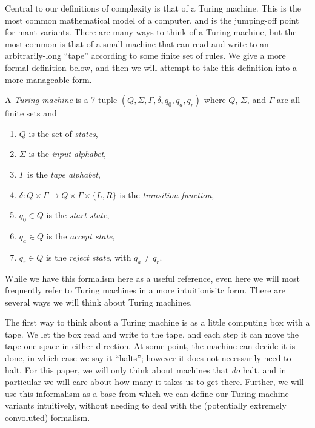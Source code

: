 Central to our definitions of complexity is that of a Turing machine. This is
the most common mathematical model of a computer, and is the jumping-off point
for mant variants. There are many ways to think of a Turing machine, but the
most common is that of a small machine that can read and write to an
arbitrarily-long ``tape'' according to some finite set of rules. We give a more
formal definition below, and then we will attempt to take this definition into a
more manageable form.
\begin{defn}\label{def:TM}
  A \emph{Turing machine} is a 7-tuple $(Q, \Sigma, \Gamma, \delta, q_{0}, q_{a}, q_{r})$ where
  $Q$, $\Sigma$, and $\Gamma$ are all finite sets and
  \begin{enumerate}
    \item $Q$ is the set of \emph{states},
    \item $\Sigma$ is the \emph{input alphabet},
    \item $\Gamma$ is the \emph{tape alphabet},
    \item $\delta: Q \times \Gamma \rightarrow Q \times \Gamma \times \{L, R\}$ is the \emph{transition function},
    \item $q_{0} \in Q$ is the \emph{start state},
    \item $q_{a} \in Q$ is the \emph{accept state},
    \item $q_{r} \in Q$ is the \emph{reject state}, with $q_{a} \ne q_{r}$.
  \end{enumerate}
\end{defn}

While we have this formalism here as a useful reference, even here we will most
frequently refer to Turing machines in a more intuitionisitc form. There are
several ways we will think about Turing machines.

The first way to think about a Turing machine is as a little computing box with
a tape. We let the box read and write to the tape, and each step it can move the
tape one space in either direction. At some point, the machine can decide it is
done, in which case we say it ``halts''; however it does not necessarily need to
halt. For this paper, we will only think about machines that \emph{do} halt, and
in particular we will care about how many it takes us to get there. Further, we
will use this informalism as a base from which we can define our Turing machine
variants intuitively, without needing to deal with the (potentially extremely
convoluted) formalism.

